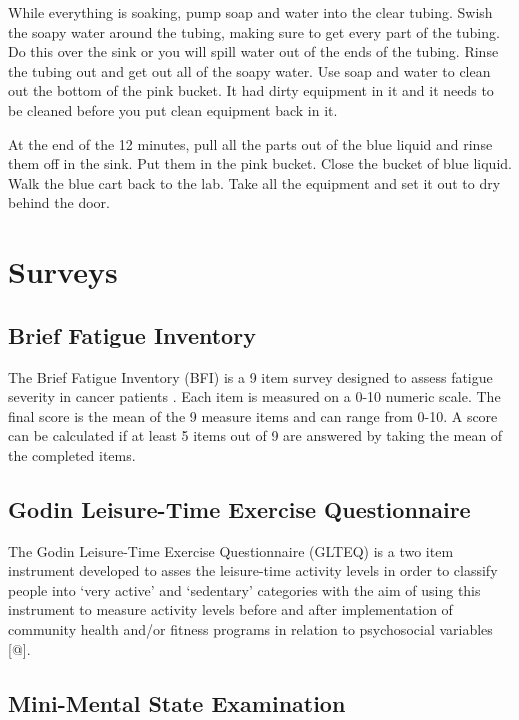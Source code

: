 \documentclass[
]{book}
\begin{document}
While everything is soaking, pump soap and water into the clear tubing. Swish the soapy water around the tubing, making sure to get every part of the tubing. Do this over the sink or you will spill water out of the ends of the tubing. Rinse the tubing out and get out all of the soapy water. Use soap and water to clean out the bottom of the pink bucket. It had dirty equipment in it and it needs to be cleaned before you put clean equipment back in it.

At the end of the 12 minutes, pull all the parts out of the blue liquid and rinse them off in the sink. Put them in the pink bucket. Close the bucket of blue liquid. Walk the blue cart back to the lab. Take all the equipment and set it out to dry behind the door.

\hypertarget{Appendix-Surveys}{%
\chapter{Surveys}\label{Appendix-Surveys}}

\hypertarget{Appendix-Surveys-bfi}{%
\section{Brief Fatigue Inventory}\label{Appendix-Surveys-bfi}}

The Brief Fatigue Inventory (BFI) is a 9 item survey designed to assess fatigue severity in cancer patients \citep{mendoza1999}. Each item is measured on a 0-10 numeric scale. The final score is the mean of the 9 measure items and can range from 0-10. A score can be calculated if at least 5 items out of 9 are answered by taking the mean of the completed items.

\hypertarget{Appendix-Surveys-glteq}{%
\section{Godin Leisure-Time Exercise Questionnaire}\label{Appendix-Surveys-glteq}}

The Godin Leisure-Time Exercise Questionnaire (GLTEQ) is a two item instrument developed to asses the leisure-time activity levels in order to classify people into `very active' and `sedentary' categories with the aim of using this instrument to measure activity levels before and after implementation of community health and/or fitness programs in relation to psychosocial variables {[}@{]}.

\hypertarget{Appendix-Surveys-mmse}{%
\section{Mini-Mental State Examination}\label{Appendix-Surveys-mmse}}
\end{document}
